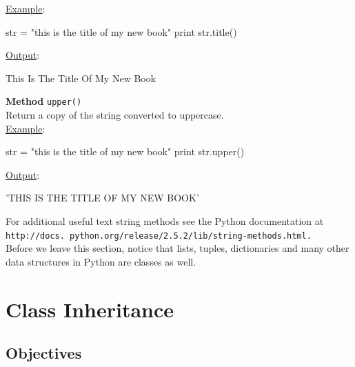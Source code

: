\noindent
\underline{Example}:
\begin{bluecode}
str = "this is the title of my new book"
print str.title()
\end{bluecode}
\underline{Output}:
\begin{bluecode}
This Is The Title Of My New Book
\end{bluecode}
\vspace{4mm}

\noindent
{\bf Method} {\tt upper()}\\
Return a copy of the string converted to uppercase.\\

\noindent
\underline{Example}:
\begin{bluecode}
str = "this is the title of my new book"
print str.upper()
\end{bluecode}
\underline{Output}:
\begin{bluecode}
'THIS IS THE TITLE OF MY NEW BOOK'
\end{bluecode}
\vspace{4mm}

\noindent
For additional useful text string methods see the Python documentation at 
{\tt http://docs. python.org/release/2.5.2/lib/string-methods.html.} \\

\noindent
Before we
leave this section, notice that lists, tuples, dictionaries and many other 
data structures in Python are classes as well.



\section{Class Inheritance}

\subsection{Objectives}

